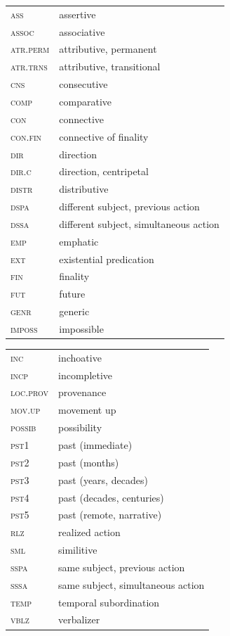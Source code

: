 \documentclass[output=paper,
modfonts,nonflat
]{langsci/langscibook}
\begin{document}
\begin{tabularx}{.5\textwidth}{lQ}
\textsc{ass } & assertive \\
\textsc{assoc } & associative \\
\textsc{atr.perm } & attributive, permanent \\
\textsc{atr.trns } & attributive, transitional \\
\textsc{cns } & consecutive \\
\textsc{comp } & comparative \\
\textsc{con } & connective \\
\textsc{con.fin } & connective of finality \\
\textsc{dir } & direction \\
\textsc{dir.c } & direction, centripetal \\
\textsc{distr } & distributive \\
\textsc{dspa } & different subject, previous action \\
\textsc{dssa } & different subject, simultaneous action \\
\textsc{emp } & emphatic \\
\textsc{ext } & existential predication \\
\textsc{fin } & finality \\
\textsc{fut } & future \\
\textsc{genr } & generic \\
\textsc{imposs } & impossible \\
\end{tabularx}
\begin{tabularx}{.45\textwidth}{lQ}
\textsc{inc } & inchoative \\
\textsc{incp } & incompletive \\
\textsc{loc.prov } & provenance \\
\textsc{mov.up } & movement up \\
\textsc{possib } & possibility \\
\textsc{pst1} & past (immediate)\\
\textsc{pst2 } & past (months)\\
\textsc{pst3} & past (years, decades)\\
\textsc{pst4} & past (decades, centuries)\\
\textsc{pst5} & past (remote, narrative)\\
\textsc{rlz } & realized action \\
\textsc{sml } & similitive \\
\textsc{sspa } & same subject, previous action \\
\textsc{sssa } & same subject, simultaneous action \\
\textsc{temp } & temporal subordination \\
\textsc{vblz } & verbalizer \\
\end{tabularx}

 

{\sloppy
\printbibliography[heading=subbibliography,notkeyword=this]
}
\end{document}
